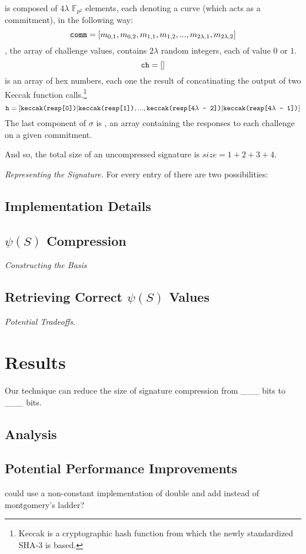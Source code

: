  is composed of $4\lambda$ $\mathbb{F}_{p^2}$ elements, each denoting a curve (which acts as a commitment), in the following way:
$$
\texttt{comm} = [m_{0, 1}, m_{0, 2}, m_{1, 1}, m_{1, 2}, ... , m_{2\lambda, 1}, m_{2\lambda, 2}]
$$
, the array of challenge values, contains $2\lambda$ random integers, each of value $0$ or $1$. 
$$
\texttt{ch} = []
$$
 is an array of hex numbers, each one the result of concatinating the output of two Keccak function calls.\footnote{Keccak is a cryptographic hash function from which the newly standardized SHA-3 is based.} 
$$
\texttt{h} = [\texttt{keccak(resp[0])}|\texttt{keccak(resp[1])}, ... , \texttt{keccak(resp[4}\lambda\texttt{ - 2])}|\texttt{keccak(resp[4}\lambda\texttt{ - 1])}]
$$
The last component of $\sigma$ is , an array containing the responses to each challenge on a given commitment. 

And so, the total size of an uncompressed signature is $size = 1 + 2 + 3 + 4$.

\textit{Representing the Signature.} For every entry of  there are two possibilities: 


\subsection{Implementation Details}

\subsection{$\psi(S)$ Compression}

\noindent
\textit{Constructing the Basis}

\subsection{Retrieving Correct $\psi(S)$ Values}

\noindent
\textit{Potential Tradeoffs}.

\section{Results}

Our technique can reduce the size of \sidh signature compression from \_\_\_ bits to \_\_\_ bits.

\subsection{Analysis}

\subsection{Potential Performance Improvements}

could use a non-constant implementation of double and add instead of montgomery's ladder? 

